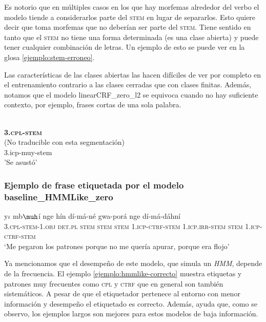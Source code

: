 \documentclass[letterpaper,12pt,oneside]{book}
\theoremstyle{definition}
\begin{document}
Es notorio que en múltiples casos en los que hay morfemas alrededor del verbo el modelo tiende a considerarlos parte del \textsc{stem} en lugar de separarlos. Esto quiere decir que toma morfemas que no deberían ser parte del \textsc{stem}. Tiene sentido en tanto que el \textsc{stem} no tiene una forma determinada (es una clase abierta) y puede tener cualquier combinación de letras. Un ejemplo de esto se puede ver en la glosa \ref{ejemplo:stem-erroneo}.

Las características de las clases abiertas las hacen difíciles de ver por completo en el entrenamiento contrario a las clases cerradas que con clases finitas. Además, notamos que el modelo \textsf{linearCRF\_zero\_l2} se equivoca cuando no hay suficiente contexto, por ejemplo, frases cortas de una sola palabra.

\begin{exe}
\ex \begin{xlist}
    \ex {}\\
    {\textbf{\textsc{3.cpl-stem}}}\\
    \trans (No traducible con esta segmentación)\label{ejemplo:stem-erroneo}
    \ex {}\\
            {3.icp-muy-stem} \\
        \trans 'Se asustó'
    \end{xlist}
\end{exe}


\subsubsection{Ejemplo de frase etiquetada por el modelo \textsf{baseline\_HMMLike\_zero}}

\begin{exe}
    \ex {} {y$\iota$} {mb$\muh$í} {nge} {hín} {dí-má-né} {gwa-porá} {nge} {dí-má-dáhní}\\
    {\textsc{3.cpl-stem-1.obj}} {\textsc{det.pl}} {\textsc{stem}} {\textsc{stem}} {\textsc{stem}} {\textsc{1.icp-ctrf-stem}} {\textsc{1.icp.irr-stem}} {\textsc{stem}} {\textsc{1.icp-ctrf-stem}}\\
    \trans `Me pegaron los patrones porque no me quería apurar, porque era flojo'\label{ejemplo:hmmlike-correcto}
\end{exe}

Ya mencionamos que el desempeño de este modelo, que simula un \textit{HMM}, depende de la frecuencia. El ejemplo \ref{ejemplo:hmmlike-correcto} muestra etiquetas y patrones muy frecuentes como \textsc{cpl} y \textsc{ctrf} que en general son también sistemáticos. A pesar de que el etiquetador pertenece al entorno con menor información y desempeño el etiquetado es correcto. Además, ayuda que, como se observo, los ejemplos largos son mejores para estos modelos de baja información.
\end{document}
